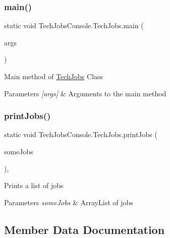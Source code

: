 \subsubsection{\texorpdfstring{main()}{main()}}
{\footnotesize\ttfamily static void Tech\+Jobs\+Console.\+Tech\+Jobs.\+main (\begin{DoxyParamCaption}\item[{String \mbox{[}$\,$\mbox{]}}]{args }\end{DoxyParamCaption})\hspace{0.3cm}{\ttfamily [static]}}

Main method of \mbox{\hyperlink{class_tech_jobs_console_1_1_tech_jobs}{Tech\+Jobs}} Class 
\begin{DoxyParams}{Parameters}
{\em \mbox{[}args\mbox{]}} & Arguments to the main method \\
\hline
\end{DoxyParams}
\mbox{\label{class_tech_jobs_console_1_1_tech_jobs_a90d0303939f42444950492f2c36925f1}} 
\subsubsection{\texorpdfstring{printJobs()}{printJobs()}}
{\footnotesize\ttfamily static void Tech\+Jobs\+Console.\+Tech\+Jobs.\+print\+Jobs (\begin{DoxyParamCaption}\item[{Array\+List$<$ Hash\+Map$<$ String, String $>$$>$}]{some\+Jobs }\end{DoxyParamCaption})\hspace{0.3cm}{\ttfamily [static]}, {\ttfamily [private]}}

Prints a list of jobs 
\begin{DoxyParams}{Parameters}
{\em some\+Jobs} & Array\+List of jobs \\
\hline
\end{DoxyParams}


\subsection{Member Data Documentation}
\mbox{\label{class_tech_jobs_console_1_1_tech_jobs_ac953bc3b00bf00267a68193946c6a1b2}} 
